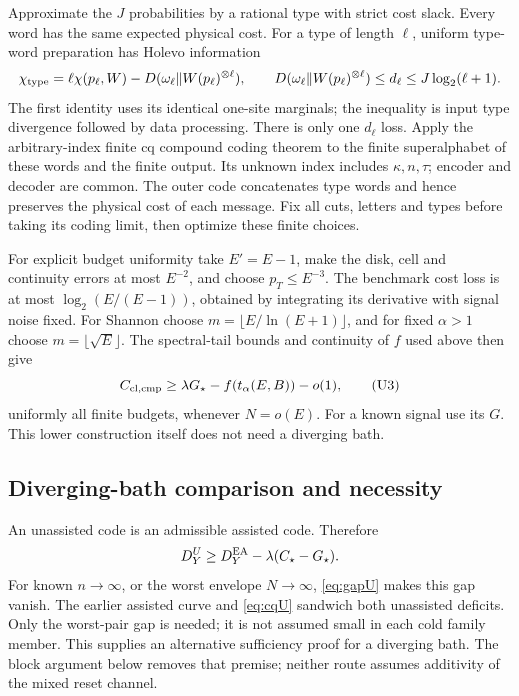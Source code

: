 \documentclass[11pt]{article}
\newcommand{\cmp}{\mathrm{cmp}}
\begin{document}
Approximate the \(J\) probabilities by a rational type with strict cost
slack. Every word has the same expected physical cost. For a type of
length \(\ell\), uniform type-word preparation has Holevo information
\[
 \chi_{\rm type}=\ell\chi(p_\ell,W)
       -D(\omega_\ell\Vert W(p_\ell)^{\otimes\ell}),\qquad
 D(\omega_\ell\Vert W(p_\ell)^{\otimes\ell})
       \le d_\ell\le J\log_2(\ell+1).
\]
The first identity uses its identical one-site marginals; the inequality
is input type divergence followed by data processing. There is only one
\(d_\ell\) loss. Apply the arbitrary-index finite cq compound coding
theorem \cite[Theorem3.1 and direct Theorem5.10]{cqcompound} to the finite
superalphabet of these words and the finite output. Its unknown index
includes \(\kappa,n,\tau\); encoder and decoder are common. The outer
code concatenates type words and hence preserves the physical cost of
each message. Fix all cuts, letters and types before taking its coding
limit, then optimize these finite choices.

For explicit budget uniformity take \(E'=E-1\), make the disk, cell and
continuity errors at most \(E^{-2}\), and choose \(p_T\le E^{-3}\).
The benchmark cost loss is at most \(\log_2(E/(E-1))\), obtained by
integrating its derivative with signal noise fixed. For Shannon choose
\(m=\lfloor E/\ln(E+1)\rfloor\), and for fixed \(\alpha>1\) choose
\(m=\lfloor\sqrt E\rfloor\). The spectral-tail bounds and continuity of
\(f\) used above then give
\begin{equation}
 C_{{\rm cl},\cmp}\ge\lambda G_\star-f(t_\alpha(E,B))-o(1),
                                                 \tag{U3}\label{eq:cqU}
\end{equation}
uniformly all finite budgets, whenever \(N=o(E)\).
For a known signal use its \(G\). This lower construction itself does
not need a diverging bath.

\subsection{Diverging-bath comparison and necessity}
An unassisted code is an admissible assisted code. Therefore
\[
 D^U_Y\ge D^{\rm EA}_Y-\lambda(C_\star-G_\star).
\]
For known \(n\to\infty\), or the worst envelope \(N\to\infty\),
\eqref{eq:gapU} makes this gap vanish. The earlier assisted curve and
\eqref{eq:cqU} sandwich both unassisted deficits. Only the worst-pair
gap is needed; it is not assumed small in each cold family member.
This supplies an alternative sufficiency proof for a diverging bath.
The block argument below removes that premise; neither route assumes
additivity of the mixed reset channel.
\end{document}
